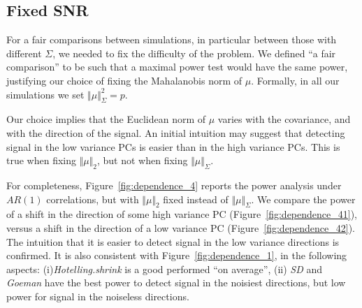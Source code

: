 \documentclass[12pt,a4paper]{article}
\begin{document}
\subsection{Fixed SNR}
\label{sec:fix_snr}

For a fair comparisons between simulations, in particular between those with different $\Sigma$, we needed to fix the difficulty of the problem.
We defined ``a fair comparison'' to be such that a maximal power test would have the same power, justifying our choice of fixing the Mahalanobis norm of $\mu$. 
Formally, in all our simulations we set $\Vert \mu \Vert_\Sigma^2=p$.

Our choice implies that the Euclidean norm of $\mu$ varies with the covariance, and with the direction of the signal.
An initial intuition may suggest that detecting signal in the low variance PCs is easier than in the high variance PCs. 
This is true when fixing $\Vert \mu \Vert_2$, but not when fixing $\Vert \mu \Vert_\Sigma$.

For completeness, Figure~\ref{fig:dependence_4} reports the power analysis under $AR(1)$ correlations, but with $\Vert \mu \Vert_2$ fixed instead of $\Vert \mu \Vert_\Sigma$.
We compare the power of a shift in the direction of some high variance PC (Figure~\ref{fig:dependence_41}), versus a shift in the direction of a low variance PC (Figure~\ref{fig:dependence_42}).
The intuition that it is easier to detect signal in the low variance directions is confirmed. 
It is also consistent with Figure~\ref{fig:dependence_1}, in the following aspects: 
(i)\emph{Hotelling.shrink} is a good performed ``on average'', 
(ii) \emph{SD} and \emph{Goeman} have the best power to detect signal in the noisiest directions, but low power for signal in the noiseless directions. 
\end{document}

